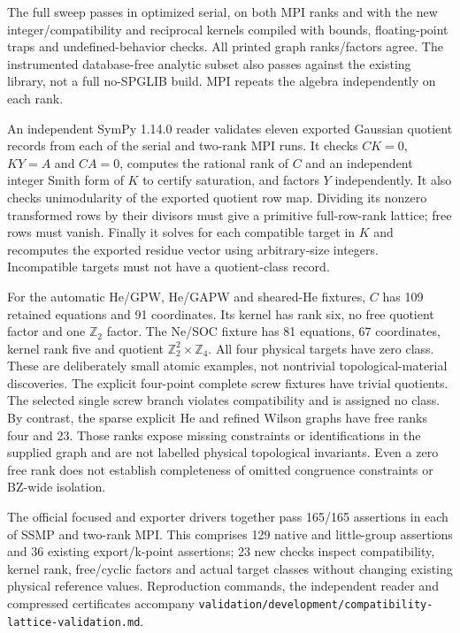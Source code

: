 \documentclass[11pt]{article}
\begin{document}
The full sweep passes in optimized serial, on both MPI ranks and
with the new integer/compatibility and reciprocal kernels compiled
with bounds, floating-point traps and undefined-behavior checks.
All printed graph ranks/factors agree. The instrumented database-free
analytic subset also passes against the existing library, not a full
no-SPGLIB build. MPI repeats the algebra independently on each rank.

An independent SymPy 1.14.0 reader validates eleven exported Gaussian
quotient records from each of the serial and two-rank MPI runs. It
checks $CK=0$, $KY=A$ and $CA=0$, computes the rational rank of $C$
and an independent integer Smith form of $K$ to certify saturation,
and factors $Y$ independently. It also checks unimodularity of the
exported quotient row map. Dividing its nonzero transformed rows by
their divisors must give a primitive full-row-rank lattice; free rows
must vanish. Finally it solves for each compatible target in $K$ and
recomputes the exported residue vector using arbitrary-size integers.
Incompatible targets must not have a quotient-class record.

For the automatic He/GPW, He/GAPW and sheared-He fixtures, $C$ has
109 retained equations and 91 coordinates. Its kernel has rank six,
no free quotient factor and one $\mathbb Z_2$ factor. The Ne/SOC
fixture has 81 equations, 67 coordinates, kernel rank five and quotient
$\mathbb Z_2^2\times\mathbb Z_4$. All four physical targets have
zero class. These are deliberately small atomic examples, not
nontrivial topological-material discoveries. The explicit four-point
complete screw fixtures have trivial quotients. The selected single
screw branch violates compatibility and is assigned no class.
By contrast, the sparse explicit He and refined Wilson graphs have
free ranks four and 23. Those ranks expose missing constraints or
identifications in the supplied graph and are not labelled physical
topological invariants. Even a zero free rank does not establish
completeness of omitted congruence constraints or BZ-wide isolation.

The official focused and exporter drivers together pass 165/165
assertions in each of SSMP and two-rank MPI. This comprises 129 native
and little-group assertions and 36 existing export/k-point assertions;
23 new checks inspect compatibility, kernel rank, free/cyclic factors
and actual target classes without changing existing physical reference
values. Reproduction commands, the independent reader and compressed
certificates accompany
\texttt{validation/development/compatibility-lattice-validation.md}.
\end{document}
